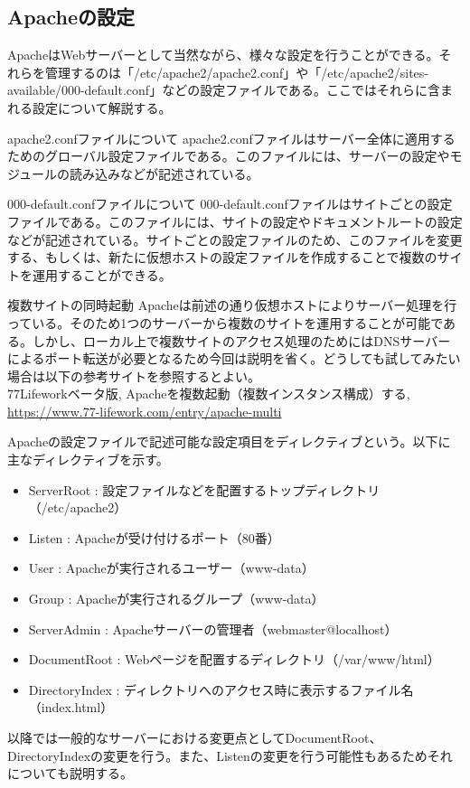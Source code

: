 \documentclass[a4paper, 11pt, dvipdfmx]{jsarticle}
\begin{document}
\subsection{Apacheの設定}
ApacheはWebサーバーとして当然ながら、様々な設定を行うことができる。それらを管理するのは「/etc/apache2/apache2.conf」や「/etc/apache2/sites-available/000-default.conf」などの設定ファイルである。ここではそれらに含まれる設定について解説する。
\begin{johobox}{apache2.confファイルについて}
  apache2.confファイルはサーバー全体に適用するためのグローバル設定ファイルである。このファイルには、サーバーの設定やモジュールの読み込みなどが記述されている。
\end{johobox}
\begin{johobox}{000-default.confファイルについて}
  000-default.confファイルはサイトごとの設定ファイルである。このファイルには、サイトの設定やドキュメントルートの設定などが記述されている。サイトごとの設定ファイルのため、このファイルを変更する、もしくは、新たに仮想ホストの設定ファイルを作成することで複数のサイトを運用することができる。
\end{johobox}
\begin{attentionbox}{複数サイトの同時起動}
  Apacheは前述の通り仮想ホストによりサーバー処理を行っている。そのため1つのサーバーから複数のサイトを運用することが可能である。しかし、ローカル上で複数サイトのアクセス処理のためにはDNSサーバーによるポート転送が必要となるため今回は説明を省く。どうしても試してみたい場合は以下の参考サイトを参照するとよい。\\
  77Lifeworkベータ版, Apacheを複数起動（複数インスタンス構成）する, \url{https://www.77-lifework.com/entry/apache-multi}
\end{attentionbox}
Apacheの設定ファイルで記述可能な設定項目をディレクティブという。以下に主なディレクティブを示す。
\begin{itemize}
  \item ServerRoot : 設定ファイルなどを配置するトップディレクトリ（/etc/apache2）
  \item Listen : Apacheが受け付けるポート（80番）
  \item User : Apacheが実行されるユーザー（www-data）
  \item Group : Apacheが実行されるグループ（www-data）
  \item ServerAdmin : Apacheサーバーの管理者（webmaster@localhost）
  \item DocumentRoot : Webページを配置するディレクトリ（/var/www/html）
  \item DirectoryIndex : ディレクトリへのアクセス時に表示するファイル名（index.html）
\end{itemize}
以降では一般的なサーバーにおける変更点としてDocumentRoot、DirectoryIndexの変更を行う。また、Listenの変更を行う可能性もあるためそれについても説明する。
\end{document}
